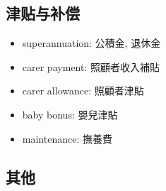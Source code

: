 \subsection*{津贴与补偿}
\begin{multicols}{2}
\begin{itemize}
  \itemsep0em
  \item superannuation: 公積金, 退休金
  \item carer payment: 照顧者收入補貼
  \item carer allowance: 照顧者津貼
  \item baby bonus: 嬰兒津貼
  \item maintenance: 撫養費
\end{itemize}
\end{multicols}

\subsection*{其他}
